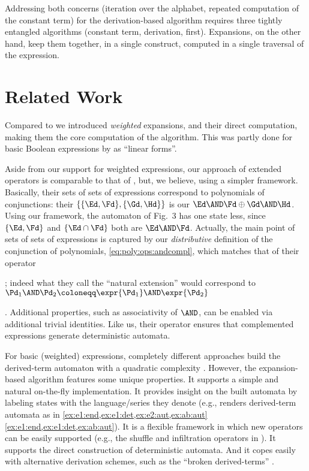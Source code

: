 \documentclass[a4paper,USenglish]{lipics}
\begin{document}
Addressing both concerns (iteration over the alphabet, repeated computation
of the constant term) for the derivation-based algorithm requires three
tightly entangled algorithms (constant term, derivation, first).
Expansions, on the other hand, keep them together, in a single construct,
computed in a single traversal of the expression.




\section{Related Work}
\label{sec:related}
Compared to \citet{brzozowski.64.jacm} we introduced \emph{weighted}
expansions, and their direct computation, making them the core computation
of the algorithm.  This was partly done for basic Boolean expressions by
\citet{antimirov.1996.tcs} as ``linear forms''.

Aside from our support for weighted expressions, our approach of extended
operators is comparable to that of \citet{caron.2011.lata.2}, but, we
believe, using a simpler framework.  Basically, their sets of sets of
expressions correspond to polynomials of conjunctions: their
$\{\{\Ed, \Fd\}, \{\Gd, \Hd\}\}$ is our $\Ed \AND \Fd \oplus \Gd \AND \Hd$.
Using our framework, the automaton of Fig.~3 \citep{caron.2011.lata.2} has
one state less, since $\{\Ed, \Fd\}$ and $\{\Ed \cap \Fd\}$ both are
$\Ed \AND \Fd$.  Actually, the main point of sets of sets of expressions is
captured by our \emph{distributive} definition of the conjunction of
polynomials, \cref{eq:poly:ops:andcompl}, which matches that of their
\raisebox{1pt}{\scalebox{.7}{\circled{$\cap$}}} operator\begin{longenv}
  ; indeed what they call the ``natural extension''
  \citep[Sect.~3.1]{caron.2011.lata.2} would correspond to
  $\Pd_1 \AND \Pd_2 \coloneqq \expr{\Pd_1} \AND \expr{\Pd_2}$
\end{longenv}
.  Additional properties, such as associativity of $\AND$, can be enabled
via additional trivial identities.  Like us, their
\raisebox{1pt}{\scalebox{.7}{\circled{$\neg$}}} operator ensures that
complemented expressions generate deterministic automata.

For basic (weighted) expressions, completely different approaches build the
derived-term automaton with a quadratic complexity
\citep{allauzen.2006.mfcs.2, champarnaud.2007.dlt.2}.  However, the
expansion-based algorithm features some unique properties.  It supports a
simple and natural on-the-fly implementation.  It provides insight on the
built automata by labeling states with the language/series they denote
(e.g., \vcsn renders derived-term automata as in 
{\cref{ex:e1:end,ex:e1:det,ex:e2:aut,ex:ab:aut}}
{\cref{ex:e1:end,ex:e1:det,ex:ab:aut}}).  It is a flexible framework in
which new operators can be easily supported (e.g., the shuffle and
infiltration operators in \vcsn).  It supports the direct construction of
deterministic automata.  And it copes easily with alternative derivation
schemes, such as the ``broken derived-terms'' \citep{lombardy.04.latin,
  lombardy.2005.tcs, lombardy.2010.rairo, angrand.2010.jalc}.
\end{document}

